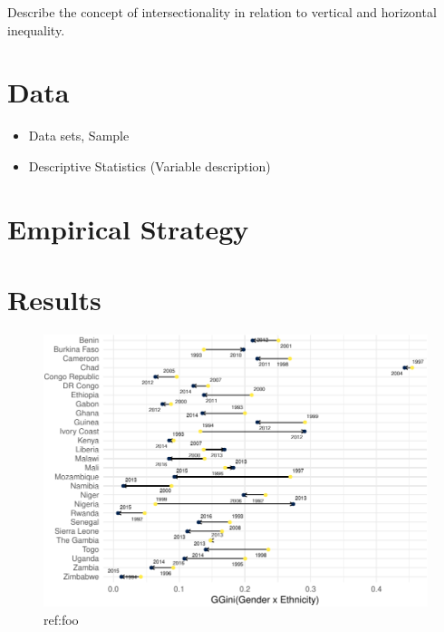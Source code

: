 \documentclass[
  11pt,
a4paper
]{article}
\providecommand{\tightlist}{%
  \setlength{\itemsep}{0pt}\setlength{\parskip}{0pt}}
\begin{document}
Describe the concept of intersectionality in relation to vertical and horizontal inequality.

\hypertarget{data}{%
\section{Data}\label{data}}

\begin{itemize}
\tightlist
\item
  Data sets, Sample
\item
  Descriptive Statistics (Variable description)
\end{itemize}

\hypertarget{empirical-strategy}{%
\section{Empirical Strategy}\label{empirical-strategy}}

\hypertarget{results}{%
\section{Results}\label{results}}



\begin{figure}
\includegraphics{horizontal_inequality_files/figure-latex/trends-eth-1} \caption[ref:foo]{ref:foo}\label{fig:trends-eth}
 \end{figure}
\end{document}
